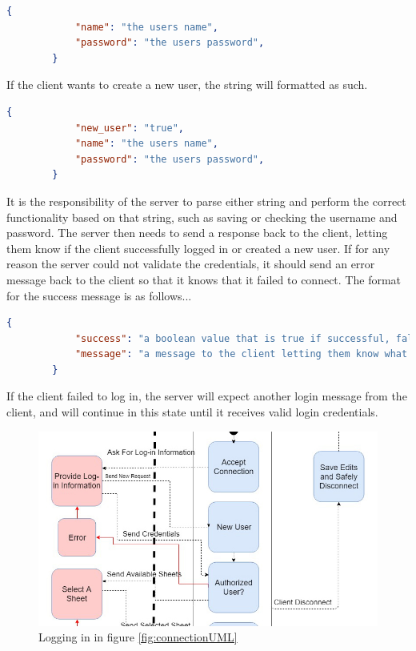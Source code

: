 \documentclass[titlepage]{article}
\begin{document}
        \begin{lstlisting}[language=json,firstnumber=1]
        {
            "name": "the users name",
            "password": "the users password",
        }
        \end{lstlisting}
        If the client wants to create a new user, the string will formatted as such.
        \begin{lstlisting}[language=json,firstnumber=1]
        {
            "new_user": "true",
            "name": "the users name",
            "password": "the users password",
        }
        \end{lstlisting}
            
        It is the responsibility of the server to parse either string and perform the correct functionality
        based on that string, such as saving or checking the username and password. The server then needs
        to send a response back to the client, letting them know if the client successfully logged in or 
        created a new user. If for any reason the server could not validate the credentials, it should send
        an error message back to the client so that it knows that it failed to connect. The format for
        the success message is as follows...

        \begin{lstlisting}[language=json,firstnumber=1]
        {
            "success": "a boolean value that is true if successful, false if not",
            "message": "a message to the client letting them know what the error was if there was one, or if the user was successfully verified or created"
        }
        \end{lstlisting}

        If the client failed to log in, the server will expect another login message from the client,
        and will continue in this state until it receives valid login credentials. 

        \begin{figure}[h!]
            \centering
            \includegraphics[width=1\linewidth]{2-3}
            \caption{Logging in in figure \ref{fig:connectionUML}}
            \label{fig:loginUML}
        \end{figure}
\end{document}
